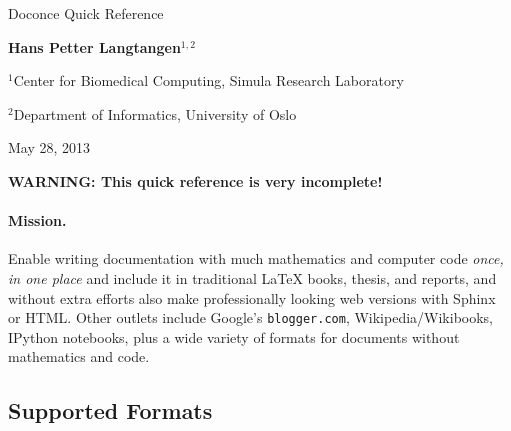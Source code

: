 \documentclass[%
oneside,                 %
final,                   %
10pt]{article}
\begin{document}



\begin{center}
{\LARGE\bf
\begin{spacing}{1.25}
Doconce Quick Reference
\end{spacing}
}
\end{center}


\begin{center}
{\bf Hans Petter Langtangen${}^{1, 2}$} \\ [0mm]
\end{center}

\begin{center}
\centerline{{\small ${}^1$Center for Biomedical Computing, Simula Research Laboratory}}
\centerline{{\small ${}^2$Department of Informatics, University of Oslo}}
\end{center}


\begin{center}
May 28, 2013
\end{center}

\vspace{1cm}



\tableofcontents

\vspace{1cm} %





\textbf{WARNING: This quick reference is very incomplete!}

\paragraph{Mission.}
Enable writing documentation with much mathematics and
computer code \emph{once, in one place} and include it in traditional {\LaTeX}
books, thesis, and reports, and without extra efforts also make
professionally looking web versions with Sphinx or HTML. Other outlets
include Google's \Verb!blogger.com!, Wikipedia/Wikibooks, IPython
notebooks, plus a wide variety of formats for documents without
mathematics and code.

\subsection{Supported Formats}
\end{document}
